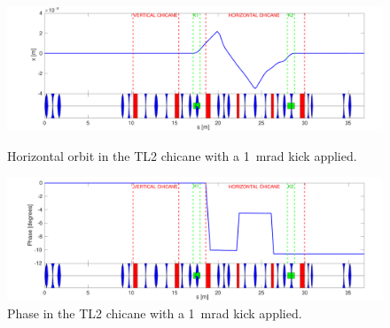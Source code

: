 {\begin{landscape}
\begin{figure}
  \centering
  \includegraphics[width=0.85\hsize]{Figures/optics/pffOpticsX}
  \caption{Horizontal orbit in the TL2 chicane with a 1~mrad kick applied.}
  \label{f:pffOpticsX}
  \includegraphics[width=0.85\hsize]{Figures/optics/pffOpticsPhase}
  \caption{Phase in the TL2 chicane with a 1~mrad kick applied.}
  \label{f:pffOpticsPhase}
\end{figure}
\end{landscape}}